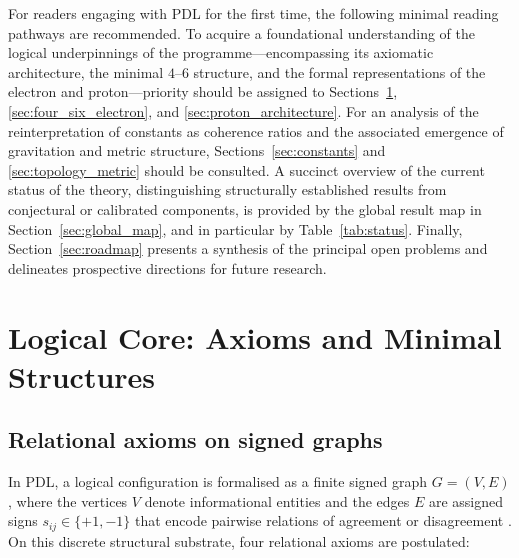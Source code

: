 \documentclass[11pt,a4paper]{article}
\begin{document}
For readers engaging with PDL for the first time, the following minimal reading pathways are recommended. To acquire a foundational understanding of the logical underpinnings of the programme—encompassing its axiomatic architecture, the minimal $4$–$6$ structure, and the formal representations of the electron and proton—priority should be assigned to Sections~\ref{sec:logical_core}, \ref{sec:four_six_electron}, and \ref{sec:proton_architecture}. For an analysis of the reinterpretation of constants as coherence ratios and the associated emergence of gravitation and metric structure, Sections~\ref{sec:constants} and \ref{sec:topology_metric} should be consulted. A succinct overview of the current status of the theory, distinguishing structurally established results from conjectural or calibrated components, is provided by the global result map in Section~\ref{sec:global_map}, and in particular by Table~\ref{tab:status}. Finally, Section~\ref{sec:roadmap} presents a synthesis of the principal open problems and delineates prospective directions for future research.

\section{Logical Core: Axioms and Minimal Structures}
\label{sec:logical_core}

\subsection{Relational axioms on signed graphs}
\label{subsec:axioms}

In PDL, a logical configuration is formalised as a finite signed graph \(G = (V, E)\), where the vertices \(V\) denote informational entities and the edges \(E\) are assigned signs \(s_{ij} \in \{+1, -1\}\) that encode pairwise relations of agreement or disagreement \citep{PDL_Main_2026,PDL_intro}. On this discrete structural substrate, four relational axioms are postulated:
\end{document}
